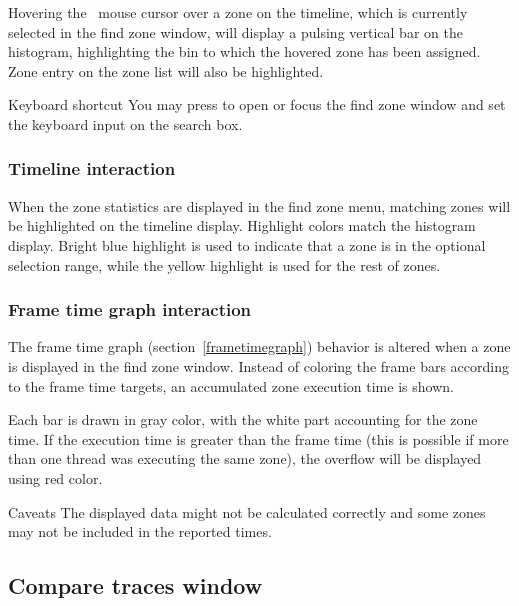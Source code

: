 \documentclass[hidelinks,titlepage,a4paper]{article}
\begin{document}
Hovering the \faMousePointer{}~mouse cursor over a zone on the timeline, which is currently selected in the find zone window, will display a pulsing vertical bar on the histogram, highlighting the bin to which the hovered zone has been assigned. Zone entry on the zone list will also be highlighted.

\begin{bclogo}[
noborder=true,
couleur=black!5,
logo=\bclampe
]{Keyboard shortcut}
You may press  to open or focus the find zone window and set the keyboard input on the search box.
\end{bclogo}

\subsubsection{Timeline interaction}

When the zone statistics are displayed in the find zone menu, matching zones will be highlighted on the timeline display. Highlight colors match the histogram display. Bright blue highlight is used to indicate that a zone is in the optional selection range, while the yellow highlight is used for the rest of zones.

\subsubsection{Frame time graph interaction}
\label{frametimefindzone}

The frame time graph (section~\ref{frametimegraph}) behavior is altered when a zone is displayed in the find zone window. Instead of coloring the frame bars according to the frame time targets, an accumulated zone execution time is shown.

Each bar is drawn in gray color, with the white part accounting for the zone time. If the execution time is greater than the frame time (this is possible if more than one thread was executing the same zone), the overflow will be displayed using red color.

\begin{bclogo}[
noborder=true,
couleur=black!5,
logo=\bcattention
]{Caveats}
The displayed data might not be calculated correctly and some zones may not be included in the reported times.
\end{bclogo}

\subsection{Compare traces window}
\label{compare}
\end{document}
